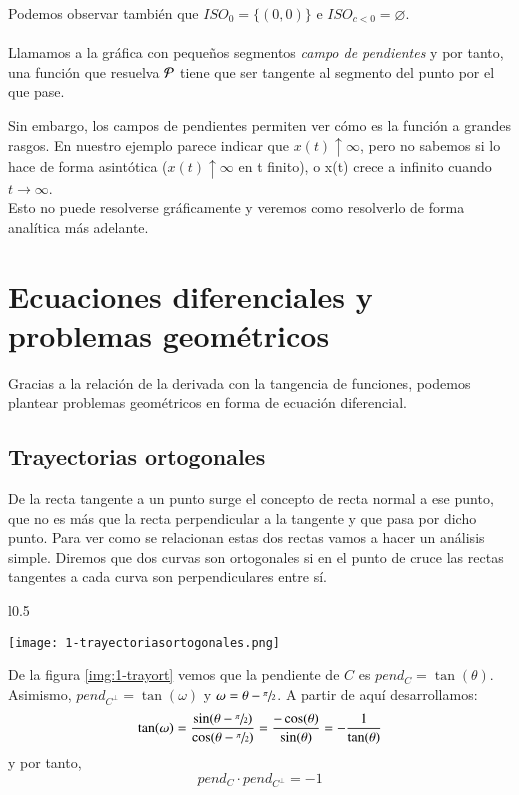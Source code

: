 \begin{eg}
\begin{minipage}[c]{0.65\textwidth}
        Podemos observar también que $ISO_0 = \{(0,0)\}$ e $ISO_{c < 0} = \varnothing$.\\\\ Llamamos a la gráfica con pequeños segmentos \textit{campo de pendientes} y por tanto, una función que resuelva $\P$ tiene que ser tangente al segmento del punto por el que pase.
    \end{minipage}
    Sin embargo, los campos de pendientes permiten ver cómo es la función a grandes rasgos. En nuestro ejemplo parece indicar que $x(t) \uparrow \infty$, pero no sabemos si lo hace de forma asintótica ($x(t) \uparrow \infty$ en t finito), o x(t) crece a infinito cuando $t \rightarrow \infty$.\\
    Esto no puede resolverse gráficamente y veremos como resolverlo de forma analítica más adelante.
\end{eg}

\section{Ecuaciones diferenciales y problemas geométricos}
Gracias a la relación de la derivada con la tangencia de funciones, podemos plantear problemas geométricos en forma de ecuación diferencial.
\subsection{Trayectorias ortogonales}
De la recta tangente a un punto surge el concepto de recta normal a ese punto, que no es más que la recta perpendicular a la tangente y que pasa por dicho punto. Para ver como se relacionan estas dos rectas vamos a hacer un análisis simple. Diremos que dos curvas son ortogonales si en el punto de cruce las rectas tangentes a cada curva son perpendiculares entre sí.
\begin{wrapfigure}[20]{l}{0.5\textwidth}
  \begin{center}
    \texttt{[image: 1-trayectoriasortogonales.png]}
  \end{center}
  \caption{Relaciones entre curvas ortogonales}\label{img:1-trayort}
\end{wrapfigure}
De la figura \ref{img:1-trayort} vemos que la pendiente de $C$ es $pend_C = \tan(\theta)$. Asimismo, $pend_{C^{\perp}} = \tan(\omega)$ y $\omega = \theta - \sfrac{\pi}{2}$. A partir de aquí desarrollamos:
$$
    \tan(\omega)=\frac{\sin(\theta-\sfrac{\pi}{2})}{\cos(\theta-\sfrac{\pi}{2})} = \frac{-\cos(\theta)}{\sin(\theta)} = -\frac{1}{\tan(\theta)}
$$
y por tanto,
\begin{equation} \label{eq:pendientes}
    pend_C \cdot pend_{C^{\perp}} = -1
\end{equation}

